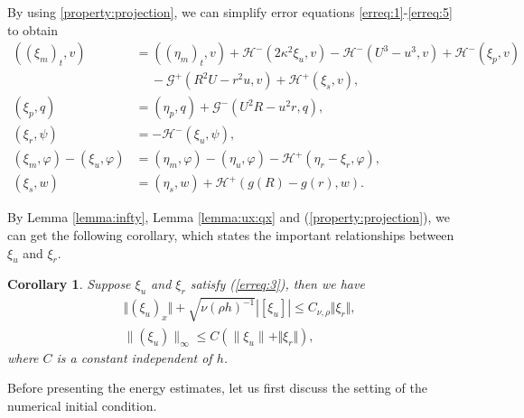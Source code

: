 \documentclass[11pt]{article}
\newcommand{\Cnurho}{C_{\nu,\rho}}
\newcommand{\norm}   [1] {\Vert#1\Vert}
\newcommand{\normb}  [1] {|\![#1]\!|}
\newcommand{\Hcal} {\mathcal{H}}
\newcommand{\Gcal} {\mathcal{G}}
\numberwithin{equation}{section}
\newtheorem{crl}{Corollary}[section]
\begin{document}
By using \eqref{property:projection}, we can simplify error equations \eqref{erreq:1}-\eqref{erreq:5} to obtain
\begin{subequations}\label{erreqv2}
\begin{align}
((\xi_m)_t, v)&=((\eta_m)_t, v)+\Hcal^-(2\kappa^2\xi_u, v)-\Hcal^-(U^3-u^3, v)+\Hcal^-(\xi_p, v)\nonumber\\
&~\quad-\!\Gcal^+(R^2U\!-\!r^2u, v)\!+\Hcal^+(\xi_s,v),\label{erreqv2:1}			\\
(\xi_p, q)&=(\eta_p, q)+\Gcal^-(U^2R-u^2r,q),\label{erreqv2:2}	\\
(\xi_r,\psi)&=-\Hcal^-(\xi_u,\psi),\label{erreqv2:3}	\\
(\xi_m,\varphi)-(\xi_u, \varphi)&=(\eta_m,\varphi)-(\eta_u,\varphi)-\Hcal^+(\eta_r-\xi_r,\varphi),\label{erreqv2:4}	\\
(\xi_s, w)&=(\eta_s, w)+\Hcal^+(g(R)-g(r),w). \label{erreqv2:5}
\end{align}
\end{subequations}
	
By Lemma \ref{lemma:infty}, Lemma \ref{lemma:ux:qx} and  (\ref{property:projection}), we can get the following corollary, which states the important relationships between $\xi_u$ and $\xi_r$.
\begin{crl}\label{corollary:xi}
	Suppose $\xi_u$ and $\xi_r$ satisfy (\ref{erreq:3}), then  we have
\begin{align}
	&\norm{(\xi_u)_x}+ \sqrt{\nu (\rho h)^{-1}}\normb{\xi_u} \le
	{\Cnurho} \norm{\xi_r}, \label{xi_u_x}\\
	&\|(\xi_u)\|_{\infty} \le C(\|\xi_u\|+\norm{\xi_r}), \label{xi_u_x2}
\end{align}
where $C$ is a constant independent of $h$.
\end{crl}


{Before presenting the energy estimates, let us first discuss the setting of the numerical initial condition.}
\end{document}

